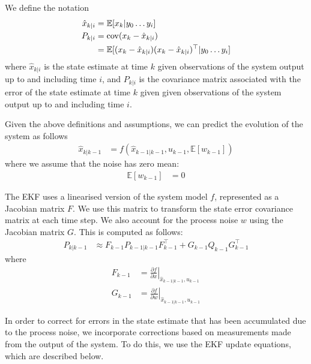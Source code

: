 \documentclass[]{article}
\begin{document}
{We define the notation
\begin{align}
	\hat{x}_{k|i} 	&= \mathbb{E}[x_k|y_0 \hdots y_i] \\
	P_{k|i} 		&= \operatorname{cov}(x_k - \hat{x}_{k|i}) \notag \\
					&= \mathbb{E}[ (x_k-\hat{x}_{k|i}) (x_k-\hat{x}_{k|i})^\top | y_0 \hdots y_i]
\end{align}
where $\hat{x}_{k|i}$ is the state estimate at time $k$ given observations of the system output up to and including time $i$, and $P_{k|i}$ is the covariance matrix associated with the error of the state estimate at time $k$ given given observations of the system output up to and including time $i$.

Given the above definitions and assumptions, we can predict the evolution of the system as follows
\begin{align}
	\hat{x}_{k|k-1} &= f(\hat{x}_{k-1|k-1}, u_{k-1}, \mathbb{E}[w_{k-1}])
	\label{eqn:predictx}
\end{align}
where we assume that the noise has zero mean:
\begin{align}
	\mathbb{E}[w_{k-1}] &= 0
\end{align}

The EKF uses a linearised version of the system model $f$, represented as a Jacobian matrix $F$. We use this matrix to transform the state error covariance matrix at each time step. We also account for the process noise $w$ using the Jacobian matrix $G$. This is computed as follows:
\begin{align}
	P_{k|k-1} &\approx F_{k-1} P_{k-1|k-1} F_{k-1}^\top + G_{k-1} Q_{k-1} G_{k-1}^\top
	\label{eqn:predictP}
\end{align}
where
\begin{align}
	F_{k-1} &= \left . \frac{\partial f}{\partial x} \right \vert _{\hat{x}_{k-1|k-1},u_{k-1}} \\
	G_{k-1} &= \left . \frac{\partial f}{\partial w} \right \vert _{\hat{x}_{k-1|k-1},u_{k-1}}
\end{align}

In order to correct for errors in the state estimate that has been accumulated due to the process noise, we incorporate corrections based on measurements made from the output of the system. To do this, we use the EKF update equations, which are described below.

}
\end{document}
